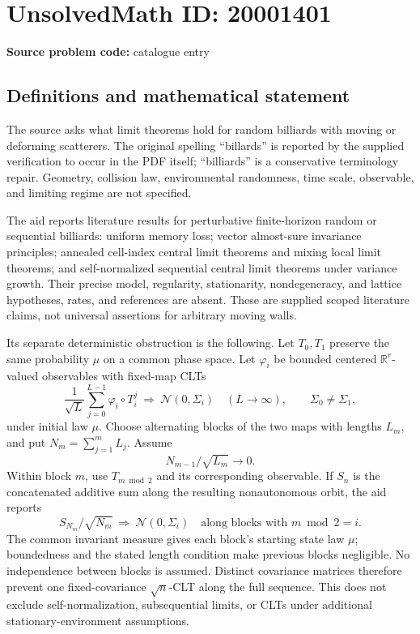 \documentclass[11pt]{article}
\newcommand{\R}{\mathbb{R}}
\begin{document}
\section*{UnsolvedMath ID: 20001401}
\textbf{Source problem code:} catalogue entry
\subsection{Definitions and mathematical statement}
The source asks what limit theorems hold for random billiards with moving or deforming scatterers. The original spelling ``billards'' is reported by the supplied verification to occur in the PDF itself; ``billiards'' is a conservative terminology repair. Geometry, collision law, environmental randomness, time scale, observable, and limiting regime are not specified.

The aid reports literature results for perturbative finite-horizon random or sequential billiards: uniform memory loss; vector almost-sure invariance principles; annealed cell-index central limit theorems and mixing local limit theorems; and self-normalized sequential central limit theorems under variance growth. Their precise model, regularity, stationarity, nondegeneracy, and lattice hypotheses, rates, and references are absent. These are supplied scoped literature claims, not universal assertions for arbitrary moving walls.

Its separate deterministic obstruction is the following. Let \(T_0,T_1\) preserve the same probability \(\mu\) on a common phase space. Let \(\varphi_i\) be bounded centered \(\R^r\)-valued observables with fixed-map CLTs
\[
 \frac1{\sqrt L}\sum_{j=0}^{L-1}\varphi_i\circ T_i^j
 \ \Longrightarrow\ \mathcal N(0,\Sigma_i)
 \quad(L\to\infty),\qquad\Sigma_0\ne\Sigma_1,
\]
under initial law \(\mu\). Choose alternating blocks of the two maps with lengths \(L_m\), and put \(N_m=\sum_{j=1}^mL_j\). Assume
\[
 N_{m-1}/\sqrt{L_m}\longrightarrow0.
\]
Within block \(m\), use \(T_{m\bmod2}\) and its corresponding observable. If \(S_n\) is the concatenated additive sum along the resulting nonautonomous orbit, the aid reports
\[
 S_{N_m}/\sqrt{N_m}\ \Longrightarrow\ \mathcal N(0,\Sigma_i)
 \quad\text{along blocks with }m\bmod2=i.
\]
The common invariant measure gives each block's starting state law \(\mu\); boundedness and the stated length condition make previous blocks negligible. No independence between blocks is assumed. Distinct covariance matrices therefore prevent one fixed-covariance \(\sqrt n\)-CLT along the full sequence. This does not exclude self-normalization, subsequential limits, or CLTs under additional stationary-environment assumptions.
\end{document}
